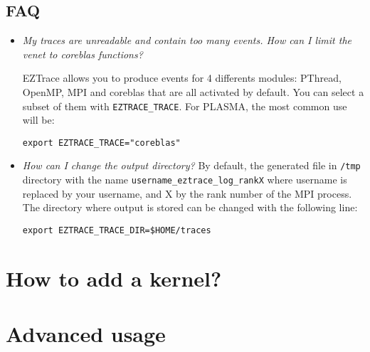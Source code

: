 \subsection{FAQ}
\begin{itemize}
\item \textit{My traces are unreadable and contain too many events. How can I
  limit the venet to coreblas functions?}\newline

  EZTrace allows you to produce events for 4 differents modules: PThread, OpenMP, MPI and
  coreblas that are all activated by default. You can select a subset
  of them with \texttt{EZTRACE\_TRACE}. For PLASMA, the most
  common use will be:
\begin{verbatim}
export EZTRACE_TRACE="coreblas"
\end{verbatim}
 
\item \textit{How can I change the output directory?}\newline
  By default, the generated file in \texttt{/tmp} directory with the
  name \texttt{username\_eztrace\_log\_rankX} where username is
  replaced by your username, and X by the rank number of the MPI process.
  The directory where output is stored can be changed with the
  following line:
\begin{verbatim}
export EZTRACE_TRACE_DIR=$HOME/traces
\end{verbatim}

\end{itemize}

\section{How to add a kernel?}

\section{Advanced usage}


